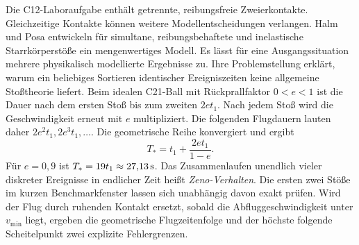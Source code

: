 Die C12-Laboraufgabe enthält getrennte, reibungsfreie Zweierkontakte. Gleichzeitige Kontakte können weitere Modellentscheidungen verlangen. Halm und Posa entwickeln für simultane, reibungsbehaftete und inelastische Starrkörperstöße ein mengenwertiges Modell. Es lässt für eine Ausgangssituation mehrere physikalisch modellierte Ergebnisse zu. Ihre Problemstellung erklärt, warum ein beliebiges Sortieren identischer Ereigniszeiten keine allgemeine Stoßtheorie liefert.
Beim idealen C21-Ball mit Rückprallfaktor \(0<e<1\) ist die Dauer nach dem ersten Stoß bis zum zweiten \(2et_1\). Nach jedem Stoß wird die Geschwindigkeit erneut mit \(e\) multipliziert. Die folgenden Flugdauern lauten daher \(2e^2t_1,2e^3t_1,\dots\). Die geometrische Reihe konvergiert und ergibt
\[
 T_*=t_1+\frac{2et_1}{1-e}.
\]
Für \(e=0{,}9\) ist \(T_*=19t_1\approx27{,}13\,\mathrm{s}\). Das Zusammenlaufen unendlich vieler diskreter Ereignisse in endlicher Zeit heißt \emph{Zeno-Verhalten}. Die ersten zwei Stöße im kurzen Benchmarkfenster lassen sich unabhängig davon exakt prüfen.
Wird der Flug durch ruhenden Kontakt ersetzt, sobald die Abfluggeschwindigkeit unter \(v_{\min}\) liegt, ergeben die geometrische Flugzeitenfolge und der höchste folgende Scheitelpunkt zwei explizite Fehlergrenzen.
